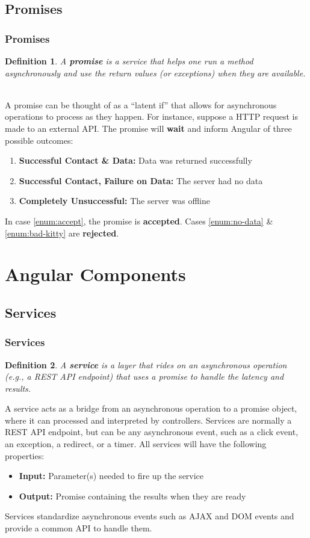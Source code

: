 \documentclass[aspectratio=169]{beamer}
\newtheorem{defn}{Definition}
\begin{document}
\subsection{Promises}
\begin{frame}
\frametitle{Promises}
\begin{defn}
A \textbf{promise} is a service that helps one run a method asynchronously and use the return values (or exceptions) when they are available.
\end{defn}

\mbox{}\\
A promise can be thought of as a ``latent if'' that allows for asynchronous operations to process as they happen. \cite{promise} For instance, suppose a HTTP request is made to an external API. The promise will \textbf{wait} and inform Angular of three possible outcomes:
\begin{enumerate}
	\item \label{enum:accept}\textbf{Successful Contact \& Data:} Data was returned successfully
	\item \label{enum:no-data}\textbf{Successful Contact, Failure on Data:} The server had no data
	\item \label{enum:bad-kitty}\textbf{Completely Unsuccessful:} The server was offline
\end{enumerate}
In case \ref{enum:accept}, the promise is \textbf{accepted}. Cases \ref{enum:no-data} \& \ref{enum:bad-kitty} are \textbf{rejected}.
\end{frame}

\section{Angular Components}
\subsection{Services}
\begin{frame}
\frametitle{Services}
\begin{defn}
A \textbf{service} is a layer that rides on an asynchronous operation (e.g., a REST API endpoint) that uses a promise to handle the latency and results.
\end{defn}

A service acts as a bridge from an asynchronous operation to a promise object, where it can processed and interpreted by controllers. Services are normally a REST API endpoint, but can be any asynchronous event, such as a click event, an exception, a redirect, or a timer. All services will have the following properties:
\begin{itemize}
	\item \textbf{Input:} Parameter(s) needed to fire up the service
	\item \textbf{Output:} Promise containing the results when they are ready
\end{itemize}

Services standardize asynchronous events such as AJAX and DOM events and provide a common API to handle them.
\end{frame}
\end{document}
